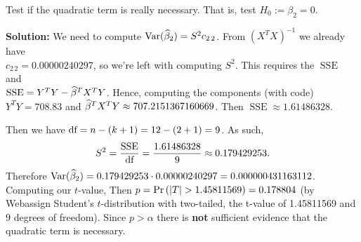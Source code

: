 Test if the quadratic term is really necessary. That is, test $H_0 := \beta_2 = 0$.

\nnl \textbf{Solution: } We need to compute $\Var*{\betah_2} = S^2 c_{2\,2}$. From $(X^TX)^{-1}$ we already have \\$c_{2\,2} = 0.00000240297$, so we're left with computing $S^2$. This requires the $\operatorname{SSE}$ and \\$\operatorname{SSE} = Y^TY - \widehat{\beta}^TX^TY$. Hence, computing the components (with code) $Y^TY = 708.83$ and $\widehat{\beta}^TX^TY \approx 707.2151367160669$. Then $\operatorname{SSE} \approx 1.61486328$.

\nl Then we have $\text{df} = n - (k+1) = 12 - (2+1) = 9$.
As such, $$S^2 = \displaystyle \frac{\operatorname{SSE}}{\text{df}} = \frac{1.61486328}{9} \approx 0.179429253.$$ Therefore $\Var*{\betah_2} = 0.179429253 \cdot 0.00000240297 = 0.000000431163112$. Computing our $t$-value, 
Then $p = \P{|T| > 1.45811569} = 0.178804$ (by Webassign Student's $t$-distribution with two-tailed, the t-value of 1.45811569 and 9 degrees of freedom). Since $p > \alpha$ there is \textbf{not} sufficient evidence that the quadratic term is necessary.